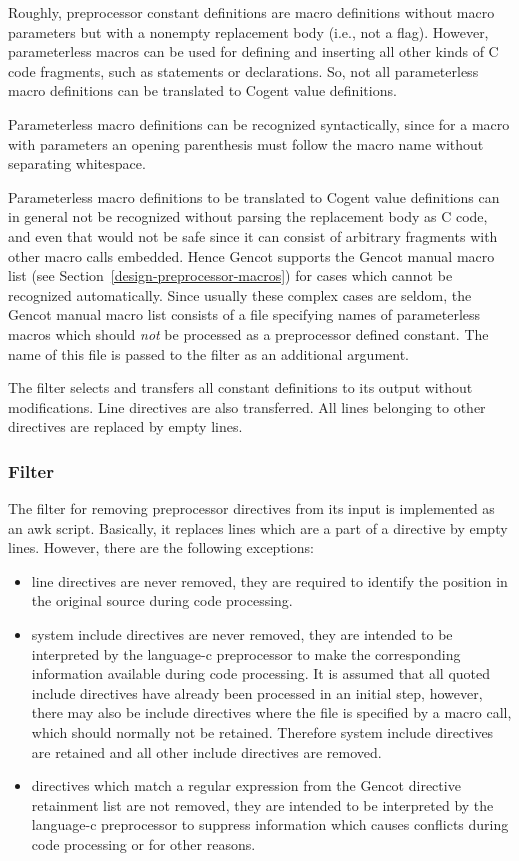 Roughly, preprocessor constant definitions are macro definitions without macro parameters but with a 
nonempty replacement body (i.e., not a flag). However, parameterless macros can be used for defining
and inserting all other kinds of C code fragments, such as statements or declarations. So, not all
parameterless macro definitions can be translated to Cogent value definitions.

Parameterless macro definitions can be recognized syntactically, since for a macro with parameters 
an opening parenthesis must follow the macro name without separating whitespace. 

Parameterless macro definitions to be translated to Cogent value definitions can in general not be 
recognized without parsing the replacement body as C code, and even that would not be safe since 
it can consist of arbitrary fragments with other macro calls embedded. Hence Gencot supports the Gencot
manual macro list (see Section~\ref{design-preprocessor-macros})
for cases which cannot be recognized automatically. Since usually these complex cases
are seldom, the Gencot manual macro list consists of a file specifying names of parameterless macros which
should \textit{not} be processed as a preprocessor defined constant. The name of this file is 
passed to the filter  as an additional argument.

The filter selects and transfers all constant definitions to its output without modifications. Line directives 
are also transferred. All lines belonging to other directives are replaced by empty lines.

\subsubsection{Filter }

The filter for removing preprocessor directives from its input is implemented as an awk script.
Basically, it replaces lines which are a part of a directive by empty lines. However, there are the following
exceptions:
\begin{itemize}
\item line directives are never removed, they are required to identify the position in the original source
during code processing.
\item system include directives are never removed, they are intended to be interpreted by the language-c
preprocessor to make the corresponding information available during code processing. It is assumed that
all quoted include directives have already been processed in an initial step, however, there may also be 
include directives where the file is specified by a macro call, which should normally not be retained.
Therefore system include directives are retained and all other include directives are removed.
\item directives which match a regular expression from the Gencot directive retainment list are not removed, 
they are intended to be interpreted by the language-c preprocessor to suppress information which causes 
conflicts during code processing or for other reasons.
\end{itemize}

